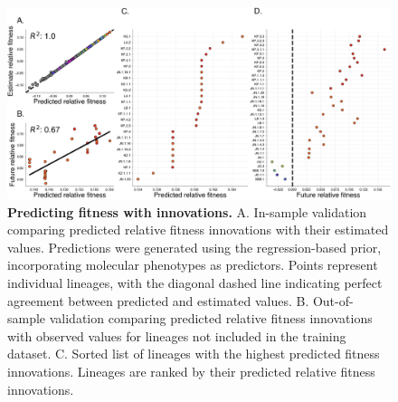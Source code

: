\begin{figure}[h]
	\centering
	\includegraphics[width=1.0\textwidth]{./figures/predicting-fitness-with-innovations.png}
	\caption{\textbf{Predicting fitness with innovations.}
	    A. In-sample validation comparing predicted relative fitness innovations with their estimated values.
	    Predictions were generated using the regression-based prior, incorporating molecular phenotypes as predictors.
	    Points represent individual lineages, with the diagonal dashed line indicating perfect agreement between predicted and estimated values.
	    B. Out-of-sample validation comparing predicted relative fitness innovations with observed values for lineages not included in the training dataset.
	    C. Sorted list of lineages with the highest predicted fitness innovations.
	    Lineages are ranked by their predicted relative fitness innovations.
	}
	\label{fig:predicting-fitness-with-innovations}
\end{figure}



